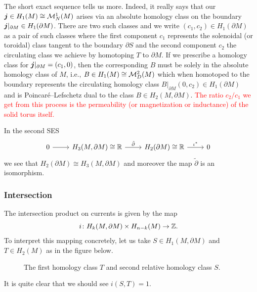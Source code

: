 \documentclass{article}
\begin{document}
The short exact sequence tells us more. Indeed, it really says that our $\boldsymbol{j}\in H_1(M) \cong \mathcal{M}^1_N(M)$ arises via an absolute homology class on the boundary $\boldsymbol{j}\vert_{\partial M} \in H_1(\partial M)$. There are two such classes and we write $(c_1,c_2)\in H_1(\partial M)$ as a pair of such classes where the first component $c_1$ represents the solenoidal (or toroidal) class tangent to the boundary $\partial S$ and the second component $c_2$ the circulating class we achieve by homotoping $T$ to $\partial M$. If we prescribe a homology class for $\boldsymbol{j}\vert_{\partial M} = (c_1,0)$, then the corresponding $B$ must be solely in the absolute homology class of $M$, i.e., $B\in H_1(M) \cong \mathcal{M}^2_D(M)$ which when homotoped to the boundary represents the circulating homology class $B\vert_{\partial M}(0,c_2)\in H_1(\partial M)$ and is Poincar\'e--Lefschetz dual to the class $B\in H_2(M,\partial M)$. \textcolor{red}{The ratio $c_2/c_1$ we get from this process is the permeability (or magnetization or inductance) of the solid torus itself.}


In the second SES
\[
\begin{tikzcd}
0 \arrow[r] & {H_3(M,\partial M)\cong \mathbb{R}} \arrow[r, "\tilde{\partial}"] & H_2(\partial M)\cong \mathbb{R} \arrow[r, "\iota^*"] & {0}
\end{tikzcd}
\]
we see that $H_2(\partial M) \cong H_3(M,\partial M)$ and moreover the map $\tilde{\partial}$ is an isomorphism. 

\subsubsection{Intersection}

The intersection product on currents is given by the map
\begin{equation}
i\colon H_k(M,\partial M) \times H_{n-k}(M) \to \mathbb{Z}.
\end{equation}
 To interpret this mapping concretely, let us take $S\in H_1(M,\partial M)$ and $T\in H_2(M)$ as in the figure below.
\begin{figure}[H]
	\centering
	
    \caption{The first homology class $T$ and second relative homology class $S$.}
\end{figure}
It is quite clear that we should see $i(S,T)=1$. 
\end{document}
